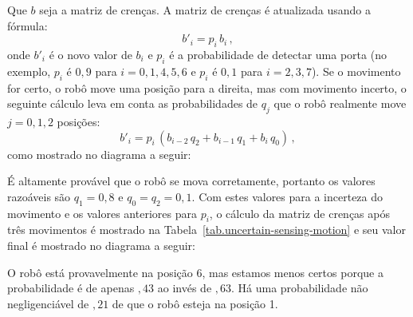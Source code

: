 Que $b$ seja a matriz de crenças. A matriz de crenças é atualizada usando a fórmula:
\begin{displaymath}
b'_i = p_i \, b_i\,,
\end{displaymath}
onde $b'_i$ é o novo valor de $b_i$ e $p_i$ é a probabilidade de detectar uma porta (no exemplo, $p_i$ é $0,9$ para $i=0,1,4,5,6$ e $p_i$ é $0,1$ para $i=2,3,7$). Se o movimento for certo, o robô move uma posição para a direita, mas com movimento incerto, o seguinte cálculo leva em conta as probabilidades de $q_j$ que o robô realmente move $j=0,1,2$ posições:
\begin{displaymath}
b'_i = p_i \,(b_{i-2}\, q_2 + b_{i-1}\, q_1 + b_{i}\, q_0)\,,
\end{displaymath}
como mostrado no diagrama a seguir:
\begin{center}
\end{center}
É altamente provável que o robô se mova corretamente, portanto os valores razoáveis são $q_1=0,8$ e $q_0=q_2=0,1$. Com estes valores para a incerteza do movimento e os valores anteriores para $p_i$, o cálculo da matriz de crenças após três movimentos é mostrado na Tabela~\ref{tab.uncertain-sensing-motion} e seu valor final é mostrado no diagrama a seguir:
\begin{center}
\end{center}
O robô está provavelmente na posição 6, mas estamos menos certos porque a probabilidade é de apenas $,43$ ao invés de $,63$. Há uma probabilidade não negligenciável de $,21$ de que o robô esteja na posição 1.

